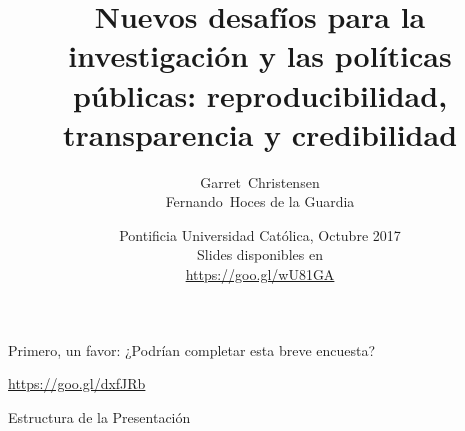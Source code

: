 \documentclass{beamer}
\title[Transparencia en Investigación en las Ciencias Sociales] %
{Nuevos desafíos para la investigación y las políticas públicas: reproducibilidad, transparencia y credibilidad}
\subtitle
{}
\author[] %
{Garret~Christensen\inst{1}\inst{2}\\
Fernando~Hoces de la Guardia\inst{1}}
\institute[Universities of Somewhere and Elsewhere] %
{
  \inst{1}%
  UC Berkeley:\\
  Berkeley Initiative for Transparency in the Social Sciences\\
  \inst{2}%
  Berkeley Institute for Data Sciences\\
}
\date[BITSS2017] %
{Pontificia Universidad Católica, Octubre 2017\\
Slides disponibles en \\ \url{https://goo.gl/wU81GA}}
\begin{document}
\begin{frame}
  \titlepage
\end{frame}






\begin{frame}
Primero, un favor: ¿Podrían completar esta breve encuesta?

\huge{\url{https://goo.gl/dxfJRb}}


\end{frame}

\begin{frame}{Estructura de la Presentación}
  \tableofcontents
\end{frame}
\end{document}
